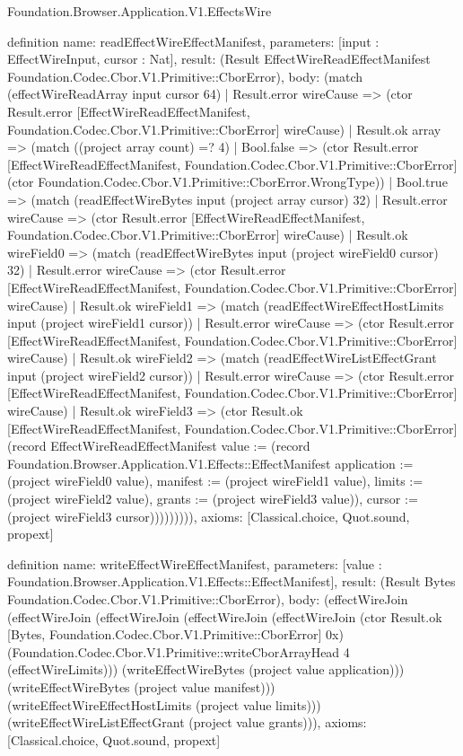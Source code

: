 \begin{lexlean}{Foundation.Browser.Application.V1.EffectsWire}
\begin{semanticmodule}
definition{
  name: readEffectWireEffectManifest,
  parameters: [input : EffectWireInput, cursor : Nat],
  result: (Result EffectWireReadEffectManifest Foundation.Codec.Cbor.V1.Primitive::CborError),
  body: (match (effectWireReadArray input cursor 64)
    | Result.error wireCause => (ctor Result.error [EffectWireReadEffectManifest, Foundation.Codec.Cbor.V1.Primitive::CborError] wireCause)
    | Result.ok array => (match ((project array count) =? 4)
      | Bool.false => (ctor Result.error [EffectWireReadEffectManifest, Foundation.Codec.Cbor.V1.Primitive::CborError] (ctor Foundation.Codec.Cbor.V1.Primitive::CborError.WrongType))
      | Bool.true => (match (readEffectWireBytes input (project array cursor) 32)
        | Result.error wireCause => (ctor Result.error [EffectWireReadEffectManifest, Foundation.Codec.Cbor.V1.Primitive::CborError] wireCause)
        | Result.ok wireField0 => (match (readEffectWireBytes input (project wireField0 cursor) 32)
          | Result.error wireCause => (ctor Result.error [EffectWireReadEffectManifest, Foundation.Codec.Cbor.V1.Primitive::CborError] wireCause)
          | Result.ok wireField1 => (match (readEffectWireEffectHostLimits input (project wireField1 cursor))
            | Result.error wireCause => (ctor Result.error [EffectWireReadEffectManifest, Foundation.Codec.Cbor.V1.Primitive::CborError] wireCause)
            | Result.ok wireField2 => (match (readEffectWireListEffectGrant input (project wireField2 cursor))
              | Result.error wireCause => (ctor Result.error [EffectWireReadEffectManifest, Foundation.Codec.Cbor.V1.Primitive::CborError] wireCause)
              | Result.ok wireField3 => (ctor Result.ok [EffectWireReadEffectManifest, Foundation.Codec.Cbor.V1.Primitive::CborError] (record EffectWireReadEffectManifest {value := (record Foundation.Browser.Application.V1.Effects::EffectManifest {application := (project wireField0 value), manifest := (project wireField1 value), limits := (project wireField2 value), grants := (project wireField3 value)}), cursor := (project wireField3 cursor)})))))))),
  axioms: [Classical.choice, Quot.sound, propext]
}

definition{
  name: writeEffectWireEffectManifest,
  parameters: [value : Foundation.Browser.Application.V1.Effects::EffectManifest],
  result: (Result Bytes Foundation.Codec.Cbor.V1.Primitive::CborError),
  body: (effectWireJoin (effectWireJoin (effectWireJoin (effectWireJoin (effectWireJoin (ctor Result.ok [Bytes, Foundation.Codec.Cbor.V1.Primitive::CborError] 0x) (Foundation.Codec.Cbor.V1.Primitive::writeCborArrayHead 4 (effectWireLimits))) (writeEffectWireBytes (project value application))) (writeEffectWireBytes (project value manifest))) (writeEffectWireEffectHostLimits (project value limits))) (writeEffectWireListEffectGrant (project value grants))),
  axioms: [Classical.choice, Quot.sound, propext]
}


\end{semanticmodule}
\end{lexlean}
